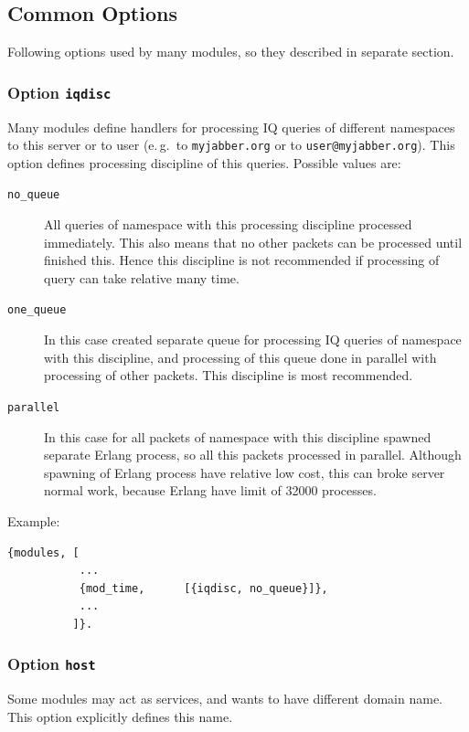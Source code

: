 \documentclass[10pt]{article}
\begin{document}
\subsection{Common Options}
\label{sec:modcommonopts}

Following options used by many modules, so they described in separate section.


\subsubsection{Option \texttt{iqdisc}}

Many modules define handlers for processing IQ queries of different namespaces
to this server or to user (e.\,g.\ to \texttt{myjabber.org} or to
\texttt{user@myjabber.org}).  This option defines processing discipline of this
queries.  Possible values are:
\begin{description}
\item[\texttt{no\_queue}] All queries of namespace with this processing
  discipline processed immediately.  This also means that no other packets can
  be processed until finished this.  Hence this discipline is not recommended
  if processing of query can take relative many time.
\item[\texttt{one\_queue}] In this case created separate queue for processing
  IQ queries of namespace with this discipline, and processing of this queue
  done in parallel with processing of other packets. This discipline is most
  recommended.
\item[\texttt{parallel}] In this case for all packets of namespace with this
  discipline spawned separate Erlang process, so all this packets processed in
  parallel.  Although spawning of Erlang process have relative low cost, this
  can broke server normal work, because Erlang have limit of 32000 processes.
\end{description}

Example:
\begin{verbatim}
{modules, [
           ...
           {mod_time,      [{iqdisc, no_queue}]},
           ...
          ]}.
\end{verbatim}


\subsubsection{Option \texttt{host}}

Some modules may act as services, and wants to have different domain name.
This option explicitly defines this name.
\end{document}
